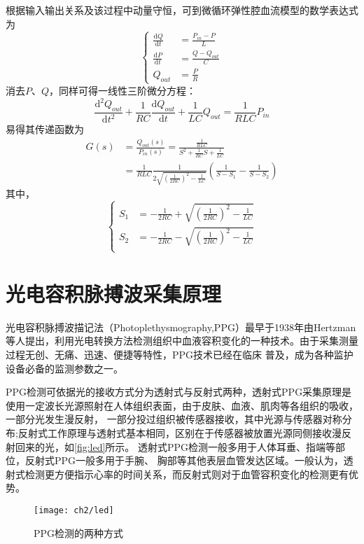 根据输入输出关系及该过程中动量守恒，可到微循环弹性腔血流模型的数学表达式为
\begin{equation}
    \label{equ:wxh1}
    \left \{
    \begin{aligned}
        \frac{\mathrm{d} Q}{\mathrm{d} t} &=\frac{P_{in}-P}{L}\\
        \frac{\mathrm{d} P}{\mathrm{d} t} &=\frac{Q-Q_{out}}{C}\\
        Q_{out} &=\frac{P}{R}
    \end{aligned}
    \right.
\end{equation}
消去$P$、$Q$，同样可得一线性三阶微分方程：
\begin{equation}
    \label{equ:wxh2}
    \frac{\mathrm{d^2} Q_{out}}{\mathrm{d} t^2}+\frac{1}{RC}\frac{\mathrm{d} Q_{out}}{\mathrm{d} t}+\frac{1}{LC}Q_{out}=\frac{1}{RLC}P_{in}
\end{equation}
易得其传递函数为
\begin{equation}
    \label{equ:hs}
    \begin{aligned}
    G(s) &=\frac{Q_{out}(s)}{P_{in}(s)}=\frac{\frac{1}{RLC}}{S^2+\frac{1}{RC}S+\frac{1}{LC}} \\
    &=\frac{1}{RLC}\frac{1}{2\sqrt{(\frac{1}{2RC})^2-\frac{1}{LC}}}(\frac{1}{S-S_{1}}-\frac{1}{S-S_{2}})
    \end{aligned}
\end{equation}
其中，
\begin{equation}
    \label{equ:ss}
    \left \{
    \begin{aligned}
        S_{1} &= -\frac{1}{2RC}+\sqrt{(\frac{1}{2RC})^2-\frac{1}{LC}}\\
        S_{2} &= -\frac{1}{2RC}-\sqrt{(\frac{1}{2RC})^2-\frac{1}{LC}}\\
    \end{aligned}
    \right.
\end{equation}
\section{光电容积脉搏波采集原理}
光电容积脉搏波描记法（Photoplethysmography,PPG）最早于1938年由Hertzman等人提出，利用光电转换方法检测组织中血液容积变化的一种技术。由于采集测量过程无创、无痛、迅速、便捷等特性，PPG技术已经在临床
普及，成为各种监护设备必备的监测参数之一\cite{ldl,lhc}。

PPG检测可依据光的接收方式分为透射式与反射式两种\cite{THOCBPM}，透射式PPG采集原理是使用一定波长光源照射在人体组织表面，由于皮肤、血液、肌肉等各组织的吸收，一部分光发生漫反射，
一部分投过组织被传感器接收，其中光源与传感器对称分布;反射式工作原理与透射式基本相同，区别在于传感器被放置光源同侧接收漫反射回来的光\cite{THOCBPM,mmt}，如\autoref{fig:led}所示。
透射式PPG检测一般多用于人体耳垂、指端等部位，反射式PPG一般多用于手腕、
胸部等其他表层血管发达区域\cite{THOCBPM}。一般认为，透射式检测更方便指示心率的时间关系，而反射式则对于血管容积变化的检测更有优势\cite{mmt}。
\begin{figure}[htb]
    \centering
    \texttt{[image: ch2/led]}
    \caption{\label{fig:led}PPG检测的两种方式}
\end{figure}

